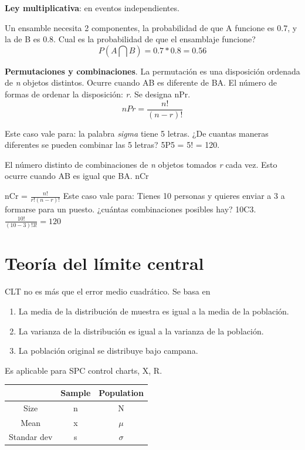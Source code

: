 \documentclass[oneside]{book}
\begin{document}
\textbf{Ley multiplicativa}: en eventos independientes.

Un ensamble necesita 2 componentes, la probabilidad de que A funcione es 0.7, y la de B es 0.8. Cual es la probabilidad de que el ensamblaje funcione? \begin{equation}
P(A \bigcap B) = 0.7*0.8 = 0.56
\end{equation}

\textbf{Permutaciones y combinaciones}. \newline La permutación es una disposición ordenada de \textit{n} objetos distintos. Ocurre cuando AB es diferente de BA. El número de formas de ordenar la disposición: \textit{r}. Se designa nPr.
\begin{equation}
nPr = \frac{n!}{(n-r)!}
\end{equation}

Este caso vale para: la palabra \textit{sigma} tiene 5 letras. ¿De cuantas maneras diferentes se pueden combinar las 5 letras? 5P5 = 5! = 120.

El número distinto de combinaciones de \textit{n} objetos tomados \textit{r} cada vez. Esto ocurre cuando AB es igual que BA. nCr

nCr = $\frac{n!}{r!(n-r)!}$
Este caso vale para: Tienes 10 personas y quieres enviar a 3 a formarse para un puesto. ¿cuántas combinaciones posibles hay? 10C3. $\frac{10!}{(10-3)!3!} = 120$

\section{Teoría del límite central}

CLT no es más que el error medio cuadrático. Se basa en

\begin{enumerate}
	\item La media de la distribución de muestra es igual a la media de la población.
	\item La varianza de la distribución es igual a la varianza de la población.
	\item La población original se distribuye bajo campana.
\end{enumerate}

Es aplicable para SPC control charts, X, R.

\begin{tabular}{|c|c|c|}
	\hline  & Sample & Population \\ 
	\hline Size & n & N \\ 
	\hline Mean & x & $\mu$ \\ 
	\hline Standar dev & s & $\sigma$ \\ 
	\hline 
\end{tabular} 
\end{document}
